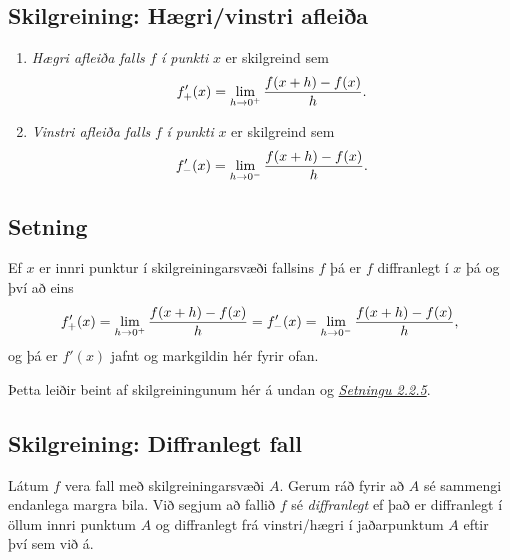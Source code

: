 \documentclass[a4paper,10pt,icelandic]{sphinxmanual}
\begin{document}

\subsection{Skilgreining: Hægri/vinstri afleiða}
\label{kafli03:index-2}\label{kafli03:skilgreining-haegri-vinstri-afleia}\begin{enumerate}
\item {} 
\emph{Hægri afleiða falls} \(f\) \emph{í punkti} \(x\) er skilgreind
sem
\begin{gather}
\begin{split}f_+'(x)=\lim_{h\rightarrow 0^+}\frac{f(x+h)-f(x)}{h}.\end{split}\notag
\end{gather}
\item {} 
\emph{Vinstri afleiða falls} \(f\) \emph{í punkti} \(x\) er
skilgreind sem
\begin{gather}
\begin{split}f_-'(x)=\lim_{h\rightarrow 0^-}\frac{f(x+h)-f(x)}{h}.\end{split}\notag
\end{gather}
\end{enumerate}


\subsection{Setning}
\label{kafli03:id2}
Ef \(x\) er innri punktur í skilgreiningarsvæði fallsins \(f\)
þá er \(f\) diffranlegt í \(x\) þá og því að eins
\begin{gather}
\begin{split}f_+'(x)=\lim_{h\rightarrow 0^+}\frac{f(x+h)-f(x)}{h}
=   f_-'(x)=\lim_{h\rightarrow 0^-}\frac{f(x+h)-f(x)}{h},\end{split}\notag
\end{gather}
og þá er \(f'(x)\) jafnt og markgildin hér fyrir ofan.

Þetta leiðir beint af skilgreiningunum hér á undan og
{\hyperref[kafli02:setning\string-hv\string-markgildi]{\emph{Setningu 2.2.5}}}.


\subsection{Skilgreining: Diffranlegt fall}
\label{kafli03:skilgreining-diffranlegt-fall}\label{kafli03:index-3}
Látum \(f\) vera fall með skilgreiningarsvæði \(A\). Gerum ráð
fyrir að \(A\) sé sammengi endanlega margra bila. Við segjum að
fallið \(f\) sé \emph{diffranlegt} ef það er diffranlegt í öllum innri
punktum \(A\) og diffranlegt frá vinstri/hægri í jaðarpunktum
\(A\) eftir því sem við á.
\end{document}
